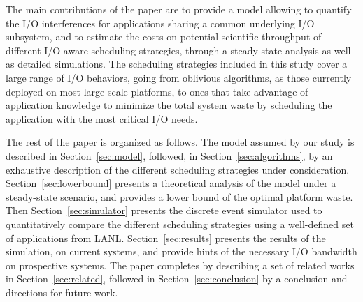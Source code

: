 The main contributions of the paper are to provide a model allowing to quantify
the I/O interferences for applications sharing a common underlying I/O
subsystem, and to estimate the costs on potential scientific throughput of different I/O-aware
scheduling strategies, through
a steady-state analysis as well as detailed simulations.
The scheduling strategies included in this study cover a
large range of I/O behaviors, going from oblivious algorithms, as those
currently deployed on most large-scale platforms, to ones that take advantage of
application knowledge to minimize the total system waste by scheduling the
application with the most critical I/O needs.

The rest of the paper is organized as follows. The model assumed by our study is
described in  Section~\ref{sec:model}, followed, in
Section~\ref{sec:algorithms}, by an exhaustive description of the different
scheduling strategies under consideration. Section~\ref{sec:lowerbound}
presents a theoretical analysis of the model under a steady-state scenario, and
provides a lower bound of the optimal platform waste. Then
Section~\ref{sec:simulator} presents the discrete event simulator used to
quantitatively compare the different scheduling strategies using a well-defined
set of applications from LANL. Section~\ref{sec:results} presents the results of
the simulation, on current systems, and provide hints of the necessary I/O
bandwidth on prospective systems. The paper completes by describing a set of
related works in Section~\ref{sec:related}, followed in
Section~\ref{sec:conclusion} by a conclusion and directions for future work.

